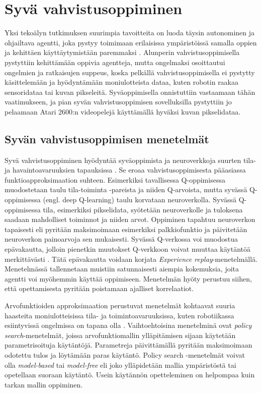 \documentclass[utf8]{gradu3}
\begin{document}
\section{Syvä vahvistusoppiminen}

Yksi tekoälyn tutkimuksen suurimpia tavoitteita on luoda täysin autonominen ja ohjailtava agentti, joka pystyy toimimaan erilaisissa ympäristöissä samalla oppien ja kehittäen käyttäytymistään paremmaksi \parencite{arulkumaran2017brief}. Alunperin vahvistusoppimisella pystyttiin kehittämään oppivia agentteja, mutta ongelmaksi osoittautui ongelmien ja ratkaisujen suppeus, koska pelkällä vahvistusoppimisella ei pystytty käsittelemään ja hyödyntämään moniulotteista dataa, kuten robotin raakaa sensoridataa tai kuvan pikseleitä. Syväoppimisella onnistuttiin vastaamaan tähän vaatimukseen, ja pian syvän vahvistusoppimisen sovelluksilla pystyttiin jo pelaamaan Atari 2600:n videopelejä käyttämällä hyväksi kuvan pikselidataa.

\subsection{Syvän vahvistusoppimisen menetelmät}

Syvä vahvistusoppiminen hyödyntää syväoppimista ja neuroverkkoja suurten tila- ja havaintoavaruuksien tapauksissa \parencite{arulkumaran2017brief,li2018deep}. Se eroaa vahvistusoppimisesta pääasiassa funktioapproksimaation suhteen. Esimerkiksi tavallisessa Q-oppimisessa muodostetaan taulu tila-toiminta -pareista ja niiden Q-arvoista, mutta syvässä Q-oppimisessa (engl. deep Q-learning) taulu korvataan neuroverkolla. Syvässä Q-oppimisessa tila, esimerkiksi pikselidata, syötetään neuroverkolle ja tuloksena saadaan mahdolliset toiminnot ja niiden arvot. Oppiminen tapahtuu neuroverkon tapaisesti eli pyritään maksimoimaan esimerkiksi palkkiofunktio ja päivitetään neuroverkon painoarvoja sen mukaisesti. Syvässä Q-verkossa voi muodostua epävakautta, jolloin pienetkin muutokset Q-verkkoon voivat muuttaa käytäntöä merkittävästi \parencite{mnih2015human}. Tätä epävakautta voidaan korjata \textit{Experience replay}-menetelmällä. Menetelmässä tallennetaan muistiin satunnaisesti aiempia kokemuksia, joita agentti voi myöhemmin käyttää oppimiseen. Menetelmän hyöty perustuu siihen, että opettamisesta pyritään poistamaan ajalliset korrelaatiot.

Arvofunktioiden approksimaation perustuvat menetelmät kohtaavat suuria haasteita moniulotteisissa tila- ja toimintoavaruuksissa, kuten robotiikassa esiintyvissä ongelmissa on tapana olla \parencite{arulkumaran2017brief,deisenroth2013survey}. Vaihtoehtoisina menetelminä ovat \textit{policy search}-menetelmät, joissa arvofunktiomallin ylläpitämisen sijaan käytetään parametrisoituja käytäntöjä. Parametreja päivittämällä pyritään maksimoimaan odotettu tulos ja löytämään paras käytäntö. Policy search -menetelmät voivat olla \textit{model-based} tai \textit{model-free} eli joko ylläpidetään mallia ympäristöstä tai opetellaan suoraan käytäntö. Usein käytännön opetteleminen on helpompaa kuin tarkan mallin oppiminen.
\end{document}
